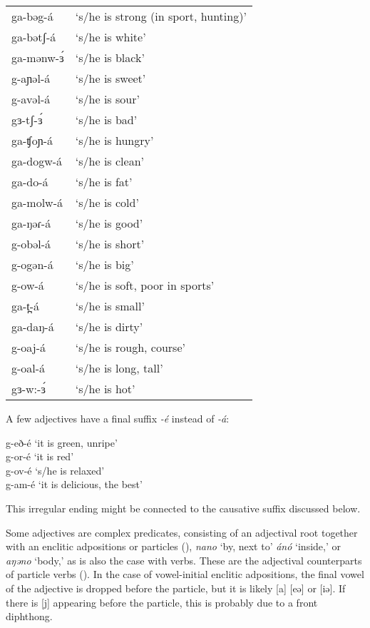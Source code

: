 \ea	\begin{tabular}[t]{ll}
	ga-bəg-á		& ‘s/he is strong (in sport, hunting)’\\
	ga-bətʃ-á	& ‘s/he is white’	\\ %
	ga-mənw-ɜ́	& ‘s/he is black’\\
	g-aɲəl-á	 & ‘s/he is sweet’\\
	g-avəl-á	& ‘s/he is sour’\\
	gɜ-tʃ-ɜ́	     & ‘s/he is bad’\\
	ga-ʧoɲ-á	& ‘s/he is hungry’\\
	ga-dogw-á	& ‘s/he is clean’\\
	ga-do-á		& ‘s/he is fat’\\
	ga-molw-á 	& ‘s/he is cold’\\
	ga-ŋəɾ-á	& ‘s/he is good’\\
	g-obəl-á	& ‘s/he is short’\\
	g-ogən-á	& ‘s/he is big’ \\
	g-ow-á	& ‘s/he is soft, poor in sports’ \\  %
	ga-t̪-á	& ‘s/he is small’\\
	ga-daŋ-á	& ‘s/he is dirty’\\
	g-oaj-á	& ‘s/he is rough, course’\\
	g-oal-á	& ‘s/he is long, tall’\\
	gɜ-w:-ɜ́	& ‘s/he is hot’\\
\end{tabular}
\z

A few adjectives have a final suffix \textit{-é} instead of \textit{-á}:

\ea	g-eð-é	‘it is green, unripe’\\
 	g-or-é	‘it is red’\\
	g-ov-é	‘s/he is relaxed’\\
	g-am-é	‘it is delicious, the best’\\
\z 
		
This irregular ending might be connected to the causative suffix discussed below. 

Some adjectives are complex predicates, consisting of an adjectival root together with an enclitic adpositions or particles (), \textit{nano} `by, next to' \textit{ánó} `inside,' or \textit{aŋəno} `body,' as is also the case with verbs. These are the adjectival counterparts of particle verbs (). In the case of vowel-initial enclitic adpositions, the final vowel of the adjective is dropped before the particle, but it is likely [a] [eə] or [iə]. If there is [j] appearing before the particle, this is probably due to a front diphthong. 

